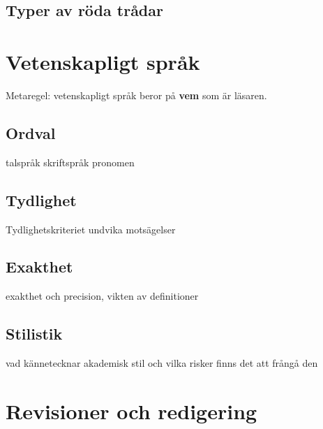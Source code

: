 \documentclass[11pt,a4paper,footinclude=true,headinclude=true]{report} %
\begin{document}
\section{Typer av röda trådar}
        




\chapter{Vetenskapligt språk}
           
           Metaregel: vetenskapligt språk beror på \textbf{vem} som är läsaren.

\section{Ordval}
talspråk skriftspråk pronomen
\section{Tydlighet}
Tydlighetskriteriet undvika motsägelser 
\section{Exakthet}
exakthet och precision, vikten av definitioner
\section{Stilistik}
vad kännetecknar akademisk stil och vilka risker finns det att frångå den







    \chapter{Revisioner och redigering}
    
    
 
\end{document}
